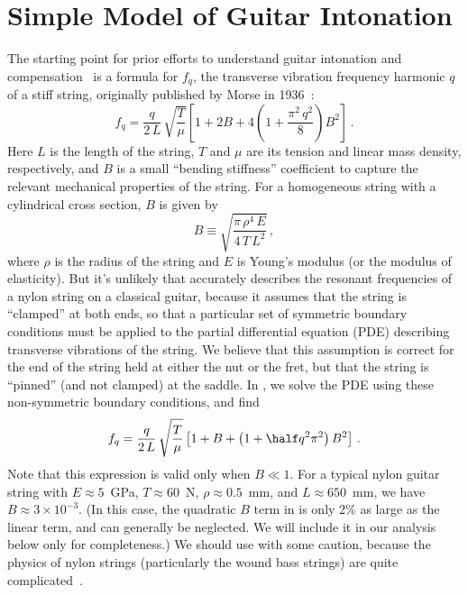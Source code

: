 %
%
%

 \section{Simple Model of Guitar Intonation\label{sct:model}}
The starting point for prior efforts to understand guitar intonation and compensation~\cite{ref:byers1996cgi,ref:varieschi2010icf} is a formula for $f_{q}$, the transverse vibration frequency harmonic $q$ of a stiff string, originally published by Morse in 1936~\cite{ref:morse1981vsb,ref:fletcher1964nvf, ref:fletcher2005pmb}:
 \begin{equation}\label{eqn:f_m_clamped}
f_{q} = \frac{q}{2\, L}\, \sqrt{\frac{T}{\mu}} \left[ 1 + 2 B + 4 \left(1 + \frac{\pi^2\, q^2}{8}\right) B^2 \right]\, .
 \end{equation}
Here $L$ is the length of the string, $T$ and $\mu$ are its tension and linear mass density, respectively, and $B$ is a small ``bending stiffness'' coefficient to capture the relevant mechanical properties of the string. For a homogeneous string with a cylindrical cross section, $B$ is given by
 \begin{equation} \label{eqn:b_def}
B \equiv \sqrt{\frac{\pi\, \rho^4\, E}{4\, T\, L^2}}\, ,
 \end{equation}
where $\rho$ is the radius of the string and $E$ is Young's modulus (or the modulus of elasticity). But it's unlikely that  accurately describes the resonant frequencies of a nylon string on a classical guitar, because it assumes that the string is ``clamped'' at both ends, so that a particular set of symmetric boundary conditions must be applied to the partial differential equation (PDE) describing transverse vibrations of the string. We believe that this assumption is correct for the end of the string held at either the nut or the fret, but that the string is ``pinned'' (and not clamped) at the saddle. In , we solve the PDE using these non-symmetric boundary conditions, and find
 \begin{equation} \label{eqn:f_m_stiff}
f_q = \frac{q}{2\, L}\, \sqrt{\frac{T}{\mu}} \left[ 1 + B + \left( 1 + \half q^2 \pi^2 \right) B^2 \right]\, .
 \end{equation}
Note that this expression is valid only when $B \ll 1$. For a typical nylon guitar string with $E \approx 5$~GPa, $T \approx 60$~N, $\rho \approx 0.5$~mm, and $L \approx 650$~mm, we have $B \approx 3 \times 10^{-3}$. (In this case, the quadratic $B$ term in  is only 2\% as large as the linear term, and can generally be neglected. We will include it in our analysis below only for completeness.) We should use  with some caution, because the physics of nylon strings (particularly the wound bass strings) are quite complicated~\cite{ref:lynchaird2017mpn}.


